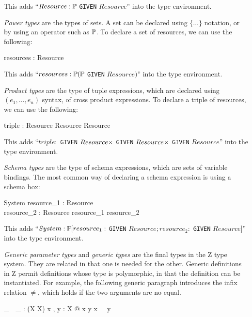 This adds ``$Resource : \power$ {\tt GIVEN} $Resource$'' into the type
environment.

{\em Power types} are the types of sets. A set can be declared using
$\{\ldots\}$ notation, or by using an operator such as $\power$. To
declare a set of resources, we can use the following:
\begin{axdef}
  resources : \power Resource
\end{axdef}

This adds ``$resources : \power (\power$ {\tt GIVEN}
$Resource)$'' into the type environment.

{\em Product types} are the type of tuple expressions, which are
declared using $(e_1, \ldots, e_n)$ syntax, of cross product expressions. To
declare a triple of resources, we can use the following:
\begin{axdef}
   triple : Resource \cross Resource \cross Resource
\end{axdef}

This adds ``$triple : $ {\tt GIVEN}
$Resource \cross$ {\tt GIVEN} $Resource \cross$ {\tt GIVEN} $Resource$''
into the type environment.

{\em Schema types} are the type of schema expressions, which are sets
of variable bindings. The most common way of declaring a schema
expression is using a schema box:
\begin{schema}{System}
  resource_1 : Resource\\
  resource_2 : Resource
\where
  resource_1 \neq resource_2
\end{schema}

This adds ``$System
: \power [resource_1 : $ {\tt GIVEN} $Resource; resource_2 : $ {\tt GIVEN}
$Resource]$'' into the type environment.

{\em Generic parameter types} and {\em generic types} are the final
types in the Z type system. They are related in that one is needed for
the other. Generic definitions in Z permit definitions whose type is
polymorphic, in that the definition can be instantiated. For example,
the following generic paragraph introduces the infix relation
$\neq$, which holds if the two arguments are no equal.

\begin{gendef}[X]
  \_~\neq~\_ : \power (X \cross X)
\where
\forall x , y : X @ x \neq y \iff \lnot x = y
\end{gendef}

